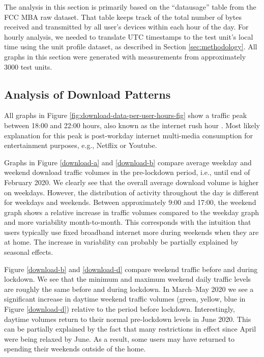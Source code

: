 The analysis in this section is primarily based on the ``datausage'' table from the FCC MBA raw dataset. That table keeps track of the total number of bytes received and transmitted by all user's devices within each hour of the day. For hourly analysis, we needed to translate UTC timestamps to the test unit's local time using the unit profile dataset, as described in Section \ref{sec:methodology}. All graphs in this section were generated with measurements from approximately 3000 test units.

\subsection{Analysis of Download Patterns}
\label{sec:analysis-of-download-patterns}

All graphs in Figure \ref{fig:download-data-per-user-hours-fig} show a traffic peak between 18:00 and 22:00 hours, also known as the internet rush hour \cite{internetrushhour}. Most likely explanation for this peak is post-workday internet multi-media consumption for entertainment purposes, e.g., Netflix or Youtube.

Graphs in Figure \ref{download-a} and \ref{download-b} compare average weekday and weekend download traffic volumes in the pre-lockdown period, i.e., until end of February 2020. We clearly see that the overall average download volume is higher on weekdays. However, the distribution of activity throughout the day is different for weekdays and weekends. Between approximately 9:00 and 17:00, the weekend graph shows a relative increase in traffic volumes compared to the weekday graph and more variability month-to-month. This corresponds with the intuition that users typically use fixed broadband internet more during weekends when they are at home. The increase in variability can probably be partially explained by seasonal effects.

Figure \ref{download-b} and \ref{download-d} compare weekend traffic before and during lockdown. We see that the minimum and maximum weekend daily traffic levels are roughly the same before and during lockdown. In March--May 2020 we see a significant increase in daytime weekend traffic volumes (green, yellow, blue in Figure \ref{download-d}) relative to the period before lockdown. Interestingly, daytime volumes return to their normal pre-lockdown levels in June 2020. This can be partially explained by the fact that many restrictions in effect since April were being relaxed by June. As a result, some users may have returned to spending their weekends outside of the home. %


